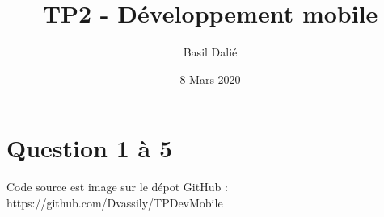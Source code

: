 \documentclass{article}
\title{TP2 - Développement mobile}
\author{Basil Dalié}
\date{8 Mars 2020}
\begin{document}
\maketitle

\section{Question 1 à 5}
Code source est image sur le dépot GitHub :
https://github.com/Dvassily/TPDevMobile
\end{document}
